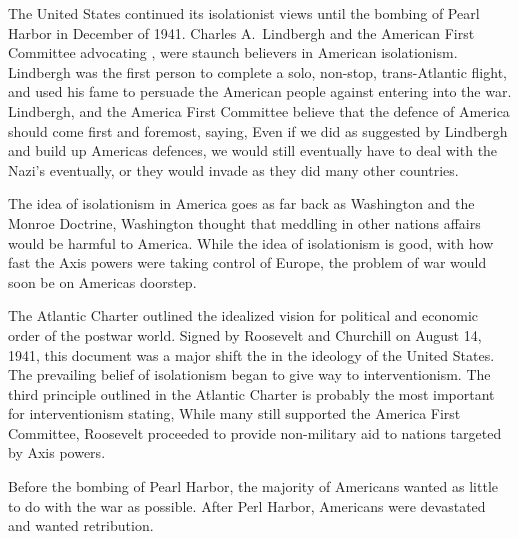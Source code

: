The United States continued its isolationist views until the bombing of Pearl Harbor in December of 1941.
Charles A.\ Lindbergh and the American First Committee advocating , were staunch believers in American isolationism.
Lindbergh was the first person to complete a solo, non-stop, trans-Atlantic flight, and used his fame to persuade the American people against entering into the war.
Lindbergh, and the America First Committee believe that the defence of America should come first and foremost, saying, 
Even if we did as suggested by Lindbergh and build up Americas defences, we would still eventually have to deal with the Nazi's eventually, or they would invade as they did many other countries.

The idea of isolationism in America goes as far back as Washington and the Monroe Doctrine, Washington thought that meddling in other nations affairs would be harmful to America.
While the idea of isolationism is good, with how fast the Axis powers were taking control of Europe, the problem of war would soon be on Americas doorstep.

The Atlantic Charter outlined the idealized vision for political and economic order of the postwar world.
Signed by Roosevelt and Churchill on August 14, 1941, this document was a major shift the in the ideology of the United States.
The prevailing belief of isolationism began to give way to interventionism.
The third principle outlined in the Atlantic Charter is probably the most important for interventionism stating, 
While many still supported the America First Committee,
Roosevelt proceeded to provide non-military aid to nations targeted by Axis powers.

Before the bombing of Pearl Harbor, the majority of Americans wanted as little to do with the war as possible.
After Perl Harbor, Americans were devastated and wanted retribution.
